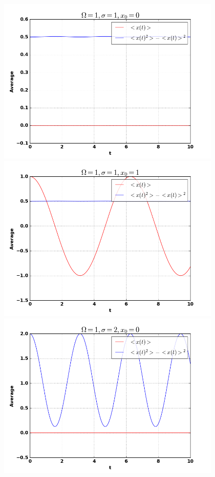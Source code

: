 \documentclass[12pt,a4paper]{article}
\begin{document}
\begin{figure}
\centering
\includegraphics[scale=0.4]{Bilder/110_av.png}
\includegraphics[scale=0.4]{Bilder/111_av.png}
\includegraphics[scale=0.4]{Bilder/120_av.png}

\end{figure}
\end{document}
